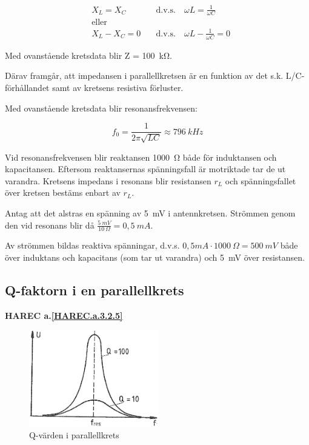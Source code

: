\begin{align*}
& X_L = X_C \quad & \text{d.v.s.} \quad \omega L = \frac{1}{\omega C} \\
& \text{eller} & \\
& X_L - X_C = 0 \quad & \text{d.v.s.} \quad \omega L - \frac{1}{\omega C} = 0
\end{align*}

Med ovanstående kretsdata blir Z = 100~kΩ.

Därav framgår, att impedansen i parallellkretsen är en funktion av det s.k.
L/C-förhållandet samt av kretsens resistiva förluster.

Med ovanstående kretsdata blir resonansfrekvensen:

\[
f_0 = \frac{1}{2π\sqrt{LC}} \approx 796\ kHz
\]

Vid resonansfrekvensen blir reaktansen 1000~Ω både för induktansen och
kapacitansen. Eftersom reaktansernas spänningsfall är motriktade tar de ut
varandra. Kretsens impedans i resonans blir resistansen \(r_L\) och
spänningsfallet över kretsen bestäms enbart av \(r_L\).

Antag att det alstras en spänning av 5~mV i antennkretsen. Strömmen genom den
vid resonans blir då \(\frac{5\ mV}{10\ Ω} = 0,5\ mA\).

Av strömmen bildas reaktiva spänningar, d.v.s.
\(0,5 mA \cdot 1000\ Ω = 500\ mV\) både över induktans och kapacitans (som tar
ut varandra) och 5~mV över resistansen.

\subsection{Q-faktorn i en parallellkrets}
\textbf{HAREC a.\ref{HAREC.a.3.2.5}\label{myHAREC.a.3.2.5}}
\label{Q-faktor}

\begin{figure}
\includegraphics[width=0.5\textwidth]{images/cropped_pdfs/bild_2_3-20.pdf}
\caption{Q-värden i parallellkrets}
\label{fig:BildII3-20}
\end{figure}

